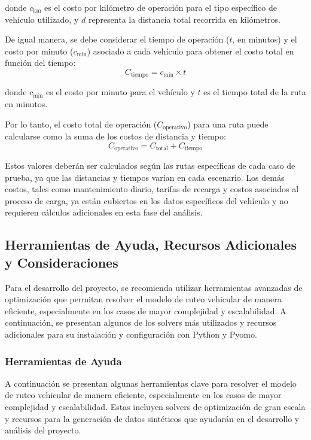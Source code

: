 \documentclass[12pt]{article}
\begin{document}
donde $c_{\text{km}}$ es el costo por kilómetro de operación para el tipo específico de vehículo utilizado, y $d$ representa la distancia total recorrida en kilómetros.

De igual manera, se debe considerar el tiempo de operación ($t$, en minutos) y el costo por minuto ($c_{\text{min}}$) asociado a cada vehículo para obtener el costo total en función del tiempo:
\begin{equation}
C_{\text{tiempo}} = c_{\text{min}} \times t
\end{equation}

donde $c_{\text{min}}$ es el costo por minuto para el vehículo y $t$ es el tiempo total de la ruta en minutos.

Por lo tanto, el costo total de operación ($C_{\text{operativo}}$) para una ruta puede calcularse como la suma de los costos de distancia y tiempo:
\begin{equation}
C_{\text{operativo}} = C_{\text{total}} + C_{\text{tiempo}}
\end{equation}

Estos valores deberán ser calculados según las rutas específicas de cada caso de prueba, ya que las distancias y tiempos varían en cada escenario. Los demás costos, tales como mantenimiento diario, tarifas de recarga y costos asociados al proceso de carga, ya están cubiertos en los datos específicos del vehículo y no requieren cálculos adicionales en esta fase del análisis.

\subsection{Herramientas de Ayuda, Recursos Adicionales y Consideraciones}

Para el desarrollo del proyecto, se recomienda utilizar herramientas avanzadas de optimización que permitan resolver el modelo de ruteo vehicular de manera eficiente, especialmente en los casos de mayor complejidad y escalabilidad. A continuación, se presentan algunos de los solvers más utilizados y recursos adicionales para su instalación y configuración con Python y Pyomo.

\subsubsection{Herramientas de Ayuda}

A continuación se presentan algunas herramientas clave para resolver el modelo de ruteo vehicular de manera eficiente, especialmente en los casos de mayor complejidad y escalabilidad. Estas incluyen solvers de optimización de gran escala y recursos para la generación de datos sintéticos que ayudarán en el desarrollo y análisis del proyecto.
\end{document}
